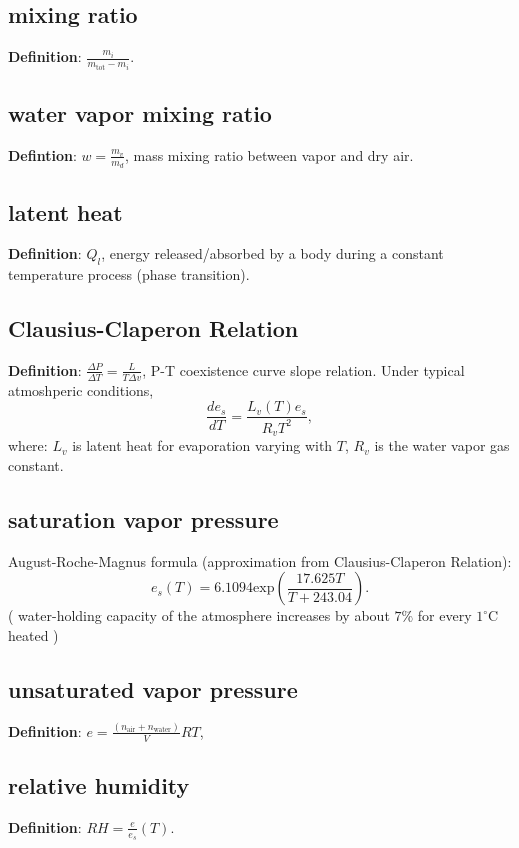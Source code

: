 \subsection{mixing ratio}
{\bf Definition}: $ \frac{m_i}{m_{\text{tot}}-m_i} $.

\subsection{water vapor mixing ratio}
{\bf Defintion}: $ w = \frac{m_v}{m_d}$, mass mixing ratio between vapor and dry air.
\subsection{latent heat}
{\bf Definition}: $Q_l$, energy released/absorbed by a body during a constant temperature process
(phase transition).


\subsection{Clausius-Claperon Relation}
{\bf Definition}: $\frac{\Delta P}{\Delta T} = \frac{L}{T\Delta v}$, P-T coexistence curve slope
relation. Under typical atmoshperic conditions, 
\begin{equation}
   \frac{d e_s}{dT} = \frac{L_v(T)e_s}{R_vT^2}, 
\end{equation}
where: $L_v$ is latent heat for evaporation varying with $T$, $R_v$ is the water vapor gas constant.
\\


\subsection{saturation vapor pressure}
August-Roche-Magnus formula (approximation from Clausius-Claperon Relation): \\
\begin{equation}
   e_s(T) = 6.1094 \text{exp}(\frac{17.625T}{T+243.04}).
\end{equation}
( water-holding capacity of the atmosphere increases by about $7\%$ for every $1^{\circ}$C heated )

\subsection{unsaturated vapor pressure}
{\bf Definition}: $e = \frac{(n_{\text{air}} + n_{\text{water}})}{V}RT$, 

\subsection{relative humidity}
{\bf Definition}: $RH = \frac{e}{e_s}(T)$.

